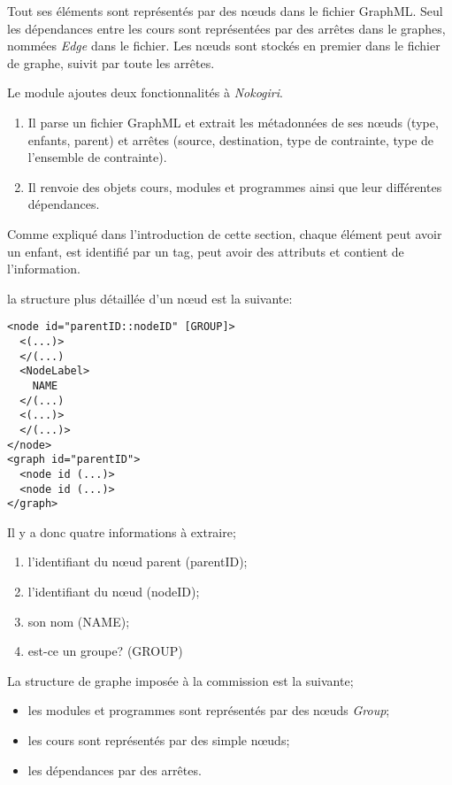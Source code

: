 Tout ses éléments sont représentés par des nœuds dans le fichier GraphML. Seul les dépendances entre les cours sont représentées par des arrêtes dans le graphes, nommées \textit{Edge} dans le fichier. Les nœuds sont stockés en premier dans le fichier de graphe, suivit par toute les arrêtes. 

Le module ajoutes deux fonctionnalités à \textit{Nokogiri}.
\begin{enumerate}
  \item Il parse un fichier GraphML et extrait les métadonnées de ses nœuds (type, enfants, parent) et arrêtes (source, destination, type de contrainte, type de l'ensemble de contrainte). 
  \item Il renvoie des objets cours, modules et programmes ainsi que leur différentes dépendances.  
\end{enumerate}

 Comme expliqué dans l'introduction de cette section, chaque élément peut avoir un enfant, est identifié par un tag, peut avoir des attributs et contient de l'information. 

 la structure plus détaillée d'un nœud est la suivante:

\begin{lstlisting}
<node id="parentID::nodeID" [GROUP]>
  <(...)>
  </(...)
  <NodeLabel>
    NAME
  </(...)
  <(...)>
  </(...)>
</node>
<graph id="parentID">
  <node id (...)>
  <node id (...)>
</graph>
\end{lstlisting}

Il y a donc quatre informations à extraire;
\begin{enumerate}
  \item l'identifiant du nœud parent (parentID);
  \item l'identifiant du nœud (nodeID);
  \item son nom (NAME);
  \item est-ce un groupe? (GROUP)
\end{enumerate}

La structure de graphe imposée à la commission est la suivante; 

\begin{itemize}
\item les modules et programmes sont représentés par des nœuds \textit{Group};
\item les cours sont représentés par des simple nœuds;
\item les dépendances par des arrêtes.
\end{itemize}

